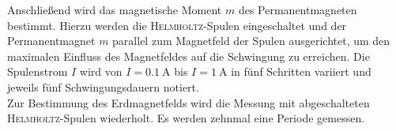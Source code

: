 Anschließend wird das magnetische Moment $m$ des Permanentmagneten bestimmt. 
Hierzu werden die \textsc{Helmholtz}-Spulen eingeschaltet und der Permanentmagnet $m$ parallel zum Magnetfeld der Spulen ausgerichtet, um den maximalen Einfluss des Magnetfeldes auf die Schwingung zu erreichen.  
Die Spulenstrom $I$ wird von $I=\SI{0.1}{\ampere}$ bis $I=\SI{1}{\ampere}$ in fünf Schritten variiert und jeweils fünf Schwingungsdauern notiert.\\
Zur Bestimmung des Erdmagnetfelds wird die Messung mit abgeschalteten \textsc{Helmholtz}-Spulen wiederholt.
Es werden zehnmal eine Periode gemessen.
